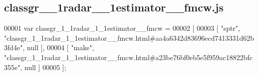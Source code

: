 \subsection{classgr\+\_\+\_\+1radar\+\_\+\_\+1estimator\+\_\+\+\_\+fmcw.\+js}
\label{classgr__1__1radar__1__1estimator____fmcw_8js_source}

\begin{DoxyCode}
00001 var classgr_1_1radar_1_1estimator__fmcw =
00002 [
00003     [ \textcolor{stringliteral}{"sptr"}, \textcolor{stringliteral}{"classgr\_1\_1radar\_1\_1estimator\_\_fmcw.html#aa4a6342d83696ecd7413331d62b3fd4e"}, null ],
00004     [ \textcolor{stringliteral}{"make"}, \textcolor{stringliteral}{"classgr\_1\_1radar\_1\_1estimator\_\_fmcw.html#a23be76bf0eb5e5f959ac18822bfc355e"}, null ]
00005 ];
\end{DoxyCode}
